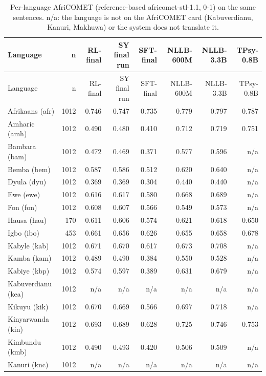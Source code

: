{\footnotesize\setlength{\tabcolsep}{3pt}
\begin{longtable}[]{@{}lrrrrrrr@{}}
\caption{Per-language AfriCOMET (reference-based africomet-stl-1.1, 0-1) on the same sentences. n/a: the language is not on the AfriCOMET card (Kabuverdianu, Kanuri, Makhuwa) or the system does not translate it.}\label{tab:t_cmp_perlang_africomet}\tabularnewline
\toprule\noalign{}
Language & n & RL-final & SY final run & SFT-final & NLLB-600M & NLLB-3.3B & TPsy-0.8B \\
\midrule\noalign{}
\endfirsthead
\toprule\noalign{}
Language & n & RL-final & SY final run & SFT-final & NLLB-600M & NLLB-3.3B & TPsy-0.8B \\
\midrule\noalign{}
\endhead
\bottomrule\noalign{}
\endlastfoot
Afrikaans (afr) & 1012 & 0.746 & 0.747 & 0.735 & 0.779 & 0.797 & 0.787 \\
Amharic (amh) & 1012 & 0.490 & 0.480 & 0.410 & 0.712 & 0.719 & 0.751 \\
Bambara (bam) & 1012 & 0.472 & 0.469 & 0.371 & 0.577 & 0.596 & n/a \\
Bemba (bem) & 1012 & 0.587 & 0.586 & 0.512 & 0.620 & 0.640 & n/a \\
Dyula (dyu) & 1012 & 0.369 & 0.369 & 0.304 & 0.440 & 0.440 & n/a \\
Ewe (ewe) & 1012 & 0.616 & 0.617 & 0.580 & 0.668 & 0.689 & n/a \\
Fon (fon) & 1012 & 0.608 & 0.607 & 0.566 & 0.549 & 0.573 & n/a \\
Hausa (hau) & 170 & 0.611 & 0.606 & 0.574 & 0.621 & 0.618 & 0.650 \\
Igbo (ibo) & 453 & 0.661 & 0.656 & 0.626 & 0.655 & 0.658 & 0.678 \\
Kabyle (kab) & 1012 & 0.671 & 0.670 & 0.617 & 0.673 & 0.708 & n/a \\
Kamba (kam) & 1012 & 0.489 & 0.490 & 0.384 & 0.550 & 0.528 & n/a \\
Kabiye (kbp) & 1012 & 0.574 & 0.597 & 0.389 & 0.631 & 0.679 & n/a \\
Kabuverdianu (kea) & 1012 & n/a & n/a & n/a & n/a & n/a & n/a \\
Kikuyu (kik) & 1012 & 0.670 & 0.669 & 0.566 & 0.697 & 0.718 & n/a \\
Kinyarwanda (kin) & 1012 & 0.693 & 0.689 & 0.628 & 0.725 & 0.746 & 0.753 \\
Kimbundu (kmb) & 1012 & 0.490 & 0.493 & 0.420 & 0.506 & 0.509 & n/a \\
Kanuri (knc) & 1012 & n/a & n/a & n/a & n/a & n/a & n/a \\

\end{longtable}}

